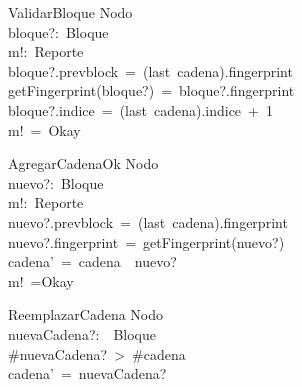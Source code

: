 \begin{schema}{ValidarBloque}
\Xi Nodo\\
bloque?:~Bloque\\
m!:~Reporte\\
\where
bloque?.prevblock~=~(last~cadena).fingerprint\\
getFingerprint(bloque?)~=~bloque?.fingerprint\\
bloque?.indice~=~(last~cadena).indice~+~1\\
m!~=~Okay\\
\end{schema}
\begin{schema}{AgregarCadenaOk}
\Delta Nodo\\
nuevo?:~Bloque\\
m!:~Reporte\\
\where
nuevo?.prevblock~=~(last~cadena).fingerprint\\
nuevo?.fingerprint~=~getFingerprint(nuevo?)\\
cadena'~=~cadena~\cat~\langle nuevo?\rangle\\
m!~=Okay\\
\end{schema}
\begin{schema}{ReemplazarCadena}
\Delta Nodo\\
nuevaCadena?:~\seq~Bloque\\
\where
\#nuevaCadena?~>~\#cadena\\
cadena'~=~nuevaCadena?\\
\end{schema}

